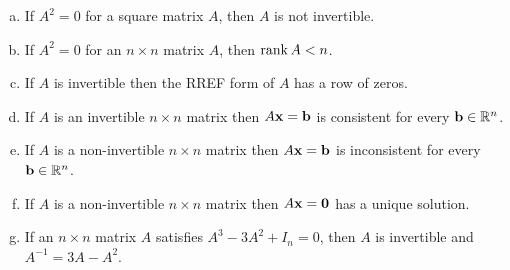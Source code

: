 \begin{prob}
\begin{enumerate}[a)]
\item\sov   If $A^2=0$ for a square matrix $A$, then $A$ is not invertible.
\medskip
%
\item If $A^2=0$ for an $ n\times n$  matrix $A$,  then $\operatorname{rank} A<n$.
\medskip
%
\item\sov  If $A$ is invertible then the RREF form of $A$ has a row of zeros.
\medskip
%
\item If $ A $ is an  invertible $ n\times n$  matrix then $A\mathbf{x}=\mathbf{b}$ is consistent for every $\mathbf{b} \in \mathbb{R}^n$.
\medskip
%
\item\sov  If $ A $ is a non-invertible $ n\times n$  matrix then $A\mathbf{x}=\mathbf{b}$ is inconsistent for every $\mathbf{b} \in \mathbb{R}^n$.
\medskip
%
\item If $ A $ is a non-invertible $ n\times n$  matrix then $A\mathbf{x}=\mathbf{0}$ has a unique solution.
\medskip
%
\item\sov  If an $ n\times n$  matrix $A$ satisfies $A^{3}-3A^{2}+I_{n}=0$, then $A$ is invertible and  $A^{-1}=3A-A^{2}$.
\medskip
%
\end{enumerate}

\end{prob}

